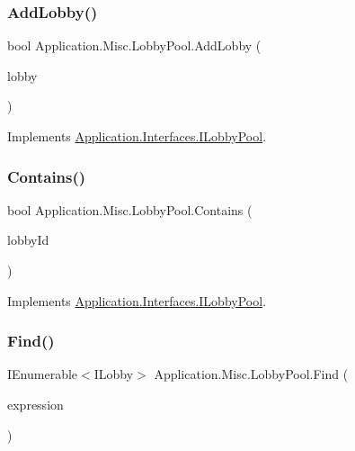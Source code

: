 \subsubsection{\texorpdfstring{Add\+Lobby()}{AddLobby()}}
{\footnotesize\ttfamily bool Application.\+Misc.\+Lobby\+Pool.\+Add\+Lobby (\begin{DoxyParamCaption}\item[{I\+Lobby}]{lobby }\end{DoxyParamCaption})}



Implements \mbox{\hyperlink{interface_application_1_1_interfaces_1_1_i_lobby_pool_a2aa933d501630b665f67c68e39012a4c}{Application.\+Interfaces.\+I\+Lobby\+Pool}}.

\mbox{\label{class_application_1_1_misc_1_1_lobby_pool_af9f3a5b65c1a948fa63796a907c1684d}} 
\subsubsection{\texorpdfstring{Contains()}{Contains()}}
{\footnotesize\ttfamily bool Application.\+Misc.\+Lobby\+Pool.\+Contains (\begin{DoxyParamCaption}\item[{string}]{lobby\+Id }\end{DoxyParamCaption})}



Implements \mbox{\hyperlink{interface_application_1_1_interfaces_1_1_i_lobby_pool_a9a09df8415ae760c99d5a6bcd1ac91f9}{Application.\+Interfaces.\+I\+Lobby\+Pool}}.

\mbox{\label{class_application_1_1_misc_1_1_lobby_pool_a3d1c9e496386713ad5d8ede307e6c28c}} 
\subsubsection{\texorpdfstring{Find()}{Find()}}
{\footnotesize\ttfamily I\+Enumerable$<$I\+Lobby$>$ Application.\+Misc.\+Lobby\+Pool.\+Find (\begin{DoxyParamCaption}\item[{Func$<$ I\+Lobby, bool $>$}]{expression }\end{DoxyParamCaption})}



